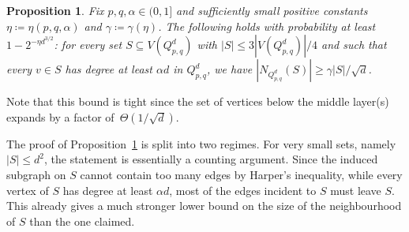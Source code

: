 \documentclass{article}
\newtheorem{proposition}[thm]{Proposition}
\theoremstyle{definition}
\begin{document}
\begin{proposition}\label{prop: expansion of high degree}
Fix $p,q,\alpha\in (0,1]$ and sufficiently small positive constants $\eta\coloneqq \eta(p,q,\alpha)$ and $\gamma\coloneqq \gamma(\eta)$. 
The following holds with probability at least $1-2^{-\eta d^{3/2}}$: for every set $S\subseteq V(Q^d_{p,q})$ with $|S|\le 3|V(Q^d_{p,q})|/4$ and such that every $v\in S$ has degree at least $\alpha d$ in $Q^d_{p,q}$, we have $|N_{Q^d_{p,q}}(S)|\ge \gamma|S|/\sqrt{d}$.
\end{proposition}
\noindent
Note that this bound is tight since the set of vertices below the middle layer(s) expands by a factor of~$\Theta(1/\sqrt{d})$. 

The proof of Proposition~\ref{prop: expansion of high degree} is split into two regimes.  
For very small sets, namely $|S|\le d^2$, the statement is essentially a counting argument. Since the induced subgraph on $S$ cannot contain too many edges by Harper's inequality, while every vertex of $S$ has degree at least $\alpha d$, most of the edges incident to $S$ must leave $S$. 
This already gives a much stronger lower bound on the size of the neighbourhood of $S$ than the one claimed. 
\end{document}
